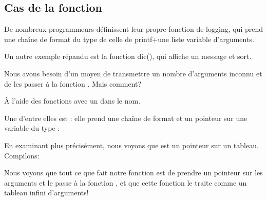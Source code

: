 \subsection{Cas de la fonction }

De nombreux programmeurs définissent leur propre fonction de logging, qui prend une
chaîne de format du type de celle de printf+une liste variable d'arguments.

Un autre exemple répandu est la fonction die(), qui affiche un message et sort.

Nous avons besoin d'un moyen de transmettre un nombre d'arguments inconnu et de les
passer à la fonction \printf.
Mais comment?

À l'aide des fonctions avec un  dans le nom.

Une d'entre elles est : elle prend une chaîne de format et un pointeur
sur une variable du type :



En examinant plus précisément, nous voyons que  est un pointeur sur
un tableau.
Compilons:



Nous voyons que tout ce que fait notre fonction est de prendre un pointeur sur les
arguments et le passe à la fonction , et que cette fonction le traite
comme un tableau infini d'arguments!


